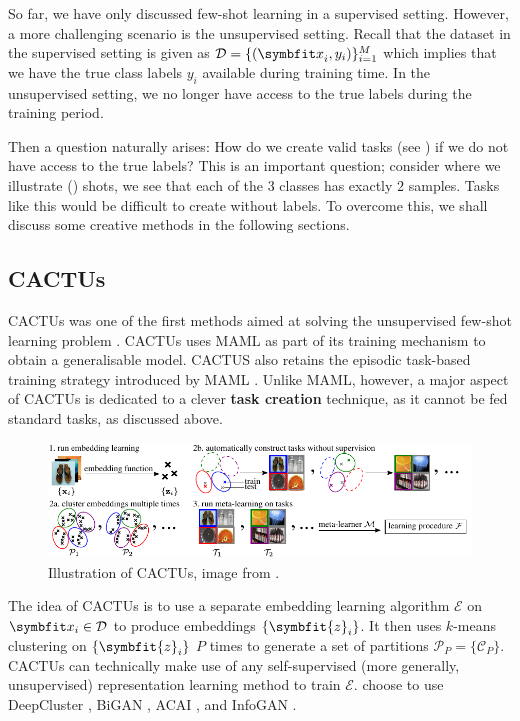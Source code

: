 So far, we have only discussed few-shot learning in a supervised setting. However, a more challenging scenario is the unsupervised setting. Recall that the dataset in the supervised setting is given as \(\mathcal{D} = \{({\symbfit x}_i, y_i)\}_{i = 1}^{M}\) which implies that we have the true class labels $y_i$ available during training time. In the unsupervised setting, we no longer have access to the true labels during the training period. 

Then a question naturally arises: How do we create valid tasks (see ) if we do not have access to the true labels? This is an important question; consider  where we illustrate () shots, we see that each of the $3$ classes has exactly $2$ samples. Tasks like this would be difficult to create without labels. To overcome this, we shall discuss some creative methods in the following sections.

\subsection{CACTUs}\label{ssec:ufsl-cactus}
CACTUs was one of the first methods aimed at solving the unsupervised few-shot learning problem \parencite{Hsu2018UnsupervisedMeta-Learning}. CACTUs uses MAML as part of its training mechanism to obtain a generalisable model. CACTUS also retains the episodic task-based training strategy introduced by MAML \parencite{Finn2017Model-agnosticNetworks}. Unlike MAML, however, a major aspect of CACTUs is dedicated to a clever \textbf{task creation} technique, as it cannot be fed standard tasks, as discussed above.
\begin{figure}[ht]
    \centering
    \includegraphics[width=\linewidth]{chapters/assets/fsl/cactus.pdf}
    \caption{Illustration of CACTUs, image from \parencite{Hsu2018UnsupervisedMeta-Learning}. }
    \label{fig:cactus}
\end{figure}
The idea of CACTUs is to use a separate embedding learning algorithm $\mathcal{E}$ on $\bfitx_i \in \mathcal{D}$ to produce embeddings $\{\symbfit{z}_i\}$. It then uses $k$-means clustering on $\{\symbfit{z}_i\}$ $P$ times to generate a set of partitions $\mathcal{P}_P = \{\mathcal{C}_P\}$. CACTUs can technically make use of any self-supervised (more generally, unsupervised) representation learning method to train $\mathcal{E}$. \textcite{Hsu2018UnsupervisedMeta-Learning} choose to use DeepCluster \parencite{caron2018deep}, BiGAN \parencite{berthelot2018understanding}, ACAI \parencite{donahue2016adversarial}, and InfoGAN \parencite{chen2016infogan}. 

